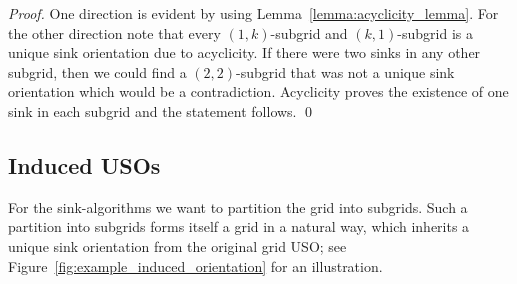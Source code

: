 \documentclass[runningheads,a4paper]{llncs}
\newcommand{\sinkalgs}{sink-algorithms\xspace}
\begin{document}
\begin{proof}
 One direction is evident by using Lemma~\ref{lemma:acyclicity_lemma}.
 For the other direction note that every $(1,k)$-subgrid and $(k,1)$-subgrid is a unique sink orientation due to acyclicity. 
 If there were two sinks in any other subgrid, then we could find a $(2,2)$-subgrid that was not a unique sink orientation which would be a contradiction.
 Acyclicity proves the existence of one sink in each subgrid and the statement follows. \qed
\end{proof}

\subsection{Induced USOs}

For the \sinkalgs we want to partition the grid into subgrids.
Such a partition into subgrids forms itself a grid in a natural way,
which inherits a unique sink orientation from the original grid USO; see Figure~\ref{fig:example_induced_orientation} for an illustration.
\end{document}
